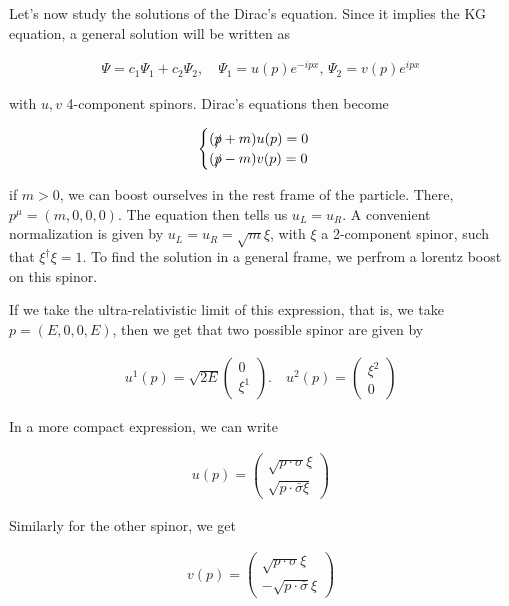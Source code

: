 \documentclass{report}
\begin{document}
Let's now study the solutions of the Dirac's equation. Since it implies the KG equation, a general solution will be written as 

\begin{align}
    \Psi = c_1\Psi_1 + c_2\Psi_2, \quad \Psi_1 = u(p)e^{-ipx}, \, \Psi_2 = v(p)e^{ipx}
\end{align}

with \(u, v\) 4-component spinors. Dirac's equations then become

\begin{align}
    \begin{cases}
        (\slashed{p}+m)u(p) = 0 \\
        (\slashed{p}-m)v(p) = 0
    \end{cases}
\end{align}

if \(m>0\), we can boost ourselves in the rest frame of the particle. There, \(p^\mu = (m, 0, 0, 0)\). The equation then tells us \(u_L = u_R\). A convenient normalization is given by \(u_L = u_R = \sqrt{m}\xi\), with \(\xi\) a 2-component spinor, such that \(\xi^\dagger\xi = 1\). To find the solution in a general frame, we perfrom a lorentz boost on this spinor. 

If we take the ultra-relativistic limit of this expression, that is, we take \(p = (E, 0, 0, E)\), then we get that two possible spinor are given by 

\begin{align}
    u^1(p) = \sqrt{2E}\begin{pmatrix}
        0 \\ \xi^1
    \end{pmatrix}. \quad u^2(p) = \begin{pmatrix}
        \xi ^2 \\ 0 
    \end{pmatrix}
\end{align}

In a more compact expression, we can write 

\begin{align}
    u(p) = \begin{pmatrix}
        \sqrt{p\cdot \sigma}\xi \\
        \sqrt{p\cdot\bar{\sigma}\xi}
    \end{pmatrix}
\end{align}

Similarly for the other spinor, we get 

\begin{align}
    v(p) = \begin{pmatrix}
        \sqrt{p\cdot\sigma}\xi \\
        -\sqrt{p\cdot\bar{\sigma}}\xi 
    \end{pmatrix}
\end{align}
\end{document}
